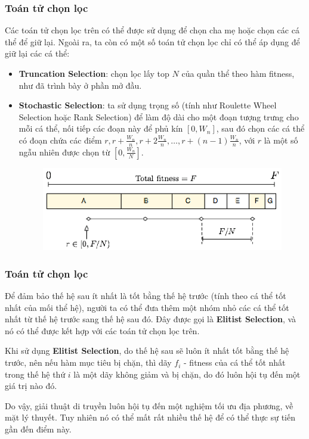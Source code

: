 \begin{frame}[fragile]
\frametitle{Toán tử chọn lọc}
Các toán tử chọn lọc trên có thể được sử dụng để chọn cha mẹ hoặc chọn các cá
thể để giữ lại. Ngoài ra, ta còn có một số toán tử chọn lọc chỉ có thể áp dụng
để giữ lại các cá thể:

\begin{itemize}
\item \textbf{Truncation Selection}: chọn lọc lấy top $N$ của quần thể theo
  hàm fitness, như đã trình bày ở phần mở đầu.

\item \textbf{Stochastic Selection}: ta sử dụng trọng số (tính như Roulette
  Wheel Selection hoặc Rank Selection) để làm độ dài cho một đoạn tượng trưng
  cho mỗi cá thể, nối tiếp các đoạn này để phủ kín \( [0, W_{n}] \), sau đó chọn
  các cá thể có đoạn chứa các điểm \( r, r + \frac{W_{n}}{n}, r + 2
  \frac{W_{n}}{n}, \ldots , r + (n - 1) \frac{W_{n}}{n} \), với $r$ là một số
  ngẫu nhiên được chọn từ $\left[ 0, \frac{W_{n}}{N} \right]$.

\begin{figure}
  \centering
  \includegraphics[width=.8\textwidth,height=0.25\textheight,keepaspectratio]
  {res/stochastic.png}
\end{figure}
\end{itemize}
\end{frame}

\begin{frame}[fragile]
\frametitle{Toán tử chọn lọc}
Để đảm bảo thế hệ sau ít nhất là tốt bằng thế hệ trước (tính theo cá thể tốt nhất của
mối thể hệ), người ta có thể đưa thêm một nhóm nhỏ các cá thể tốt nhất từ thế hệ
trước sang thế hệ sau đó. Đây được gọi là \textbf{Elitist Selection}, và nó có
thể được kết hợp với các toán tử chọn lọc trên.

Khi sử dụng \textbf{Elitist Selection}, do thế hệ sau sẽ luôn ít nhất tốt bằng
thế hệ trước, nên nếu hàm mục tiêu bị chặn, thì dãy $f_{i}$ - fitness của cá thể
tốt nhất trong thế hệ thứ $i$ là một dãy không giảm và bị chặn, do đó luôn hội
tụ đến một giá trị nào đó.

Do vậy, giải thuật di truyền luôn hội tụ đến một nghiệm tối ưu địa phương, về
mặt lý thuyết. Tuy nhiên nó có thể mất rất nhiều thế hệ để có thể thực sự tiến
gần đến điểm này.
\end{frame}

